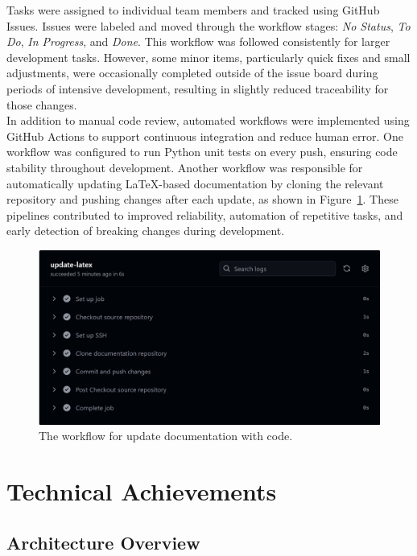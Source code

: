 Tasks were assigned to individual team members and tracked using GitHub Issues. Issues were labeled and moved through the workflow stages: \textit{No Status}, \textit{To Do}, \textit{In Progress}, and \textit{Done}. This workflow was followed consistently for larger development tasks. However, some minor items, particularly quick fixes and small adjustments, were occasionally completed outside of the issue board during periods of intensive development, resulting in slightly reduced traceability for those changes.\\

In addition to manual code review, automated workflows were implemented using GitHub Actions to support continuous integration and reduce human error. One workflow was configured to run Python unit tests on every push, ensuring code stability throughout development. Another workflow was responsible for automatically updating LaTeX-based documentation by cloning the relevant repository and pushing changes after each update, as shown in Figure~\ref{fig:workflow-latex}. These pipelines contributed to improved reliability, automation of repetitive tasks, and early detection of breaking changes during development. \\

\begin{figure}[h!] \centering 
\includegraphics[width=0.75\linewidth]{figures/results/workflows/latex.png}\caption[Upload LaTeX workflow]{The workflow for update documentation with code.}\label{fig:workflow-latex} \end{figure}

\newpage

\section{Technical Achievements}

\subsection{Architecture Overview}
\label{subsec:diagrams}

